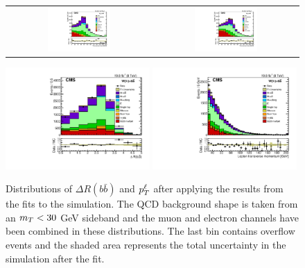 \begin{figure}[htb]
\begin{centering}
\begin{tabular}{cc}
\includegraphics[width=0.45\textwidth]{pdfs/wbbxc/pape/postcfit_wbb_mt_mu} &
\includegraphics[width=0.45\textwidth]{pdfs/wbbxc/pape/postcfit_wbb_mt_ele}
\end{tabular}
\end{centering}
\label{fig:fittingplots}
\end{figure}


\begin{figure}[!htb]
\center
\includegraphics[width=0.49\textwidth]{pdfs/wbbxc/pape/postcfit_wbb_dRJ1J2}
\includegraphics[width=0.49\textwidth]{pdfs/wbbxc/pape/postcfit_wbb_pTLep}
\caption[More variables in the \wbb signal region]{
  Distributions of $\Delta R(b\bar{b})$ and $p_T^\ell$ after
   applying the results from the fits to the simulation.
  The QCD background shape is taken from an $m_T<30$ GeV sideband and the
   muon and electron channels have been combined in these distributions.
  The last bin contains overflow events and
   the shaded area represents the total uncertainty in the simulation after the fit.
 }
\label{fig:postfit_drbb_ptl}
\end{figure}



